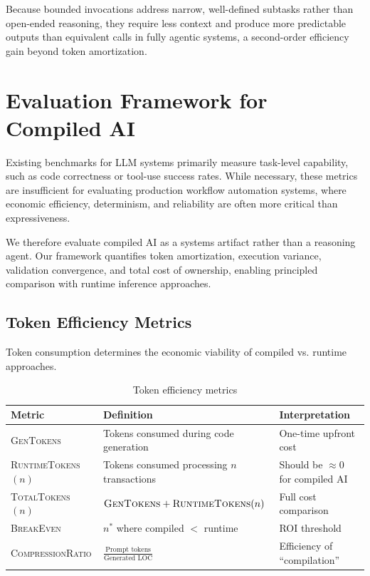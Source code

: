\documentclass[11pt]{article}
\newcommand{\metric}[1]{\textsc{#1}}
\begin{document}
Because bounded invocations address narrow, well-defined subtasks rather than open-ended reasoning, they require less context and produce more predictable outputs than equivalent calls in fully agentic systems, a second-order efficiency gain beyond token amortization.

\section{Evaluation Framework for Compiled AI}
\label{sec:framework}

Existing benchmarks for LLM systems primarily measure task-level capability, such as code correctness or tool-use success rates. While necessary, these metrics are insufficient for evaluating production workflow automation systems, where economic efficiency, determinism, and reliability are often more critical than expressiveness.

We therefore evaluate compiled AI as a systems artifact rather than a reasoning agent. Our framework quantifies token amortization, execution variance, validation convergence, and total cost of ownership, enabling principled comparison with runtime inference approaches.

\subsection{Token Efficiency Metrics}

Token consumption determines the economic viability of compiled vs. runtime approaches.

\begin{table}[ht]
\centering
\caption{Token efficiency metrics}
\label{tab:token-metrics}
\begin{tabular}{p{3.5cm}p{4cm}p{4.5cm}}
\toprule
Metric & Definition & Interpretation \\
\midrule
\metric{GenTokens} & Tokens consumed during code generation & One-time upfront cost \\
\metric{RuntimeTokens}$(n)$ & Tokens consumed processing $n$ transactions & Should be $\approx 0$ for compiled AI \\
\metric{TotalTokens}$(n)$ & $\text{\metric{GenTokens}} + \text{\metric{RuntimeTokens}}(n)$ & Full cost comparison \\
\metric{BreakEven} & $n^*$ where compiled $<$ runtime & ROI threshold \\
\metric{CompressionRatio} & $\frac{\text{Prompt tokens}}{\text{Generated LOC}}$ & Efficiency of ``compilation'' \\
\bottomrule
\end{tabular}
\end{table}
\end{document}

